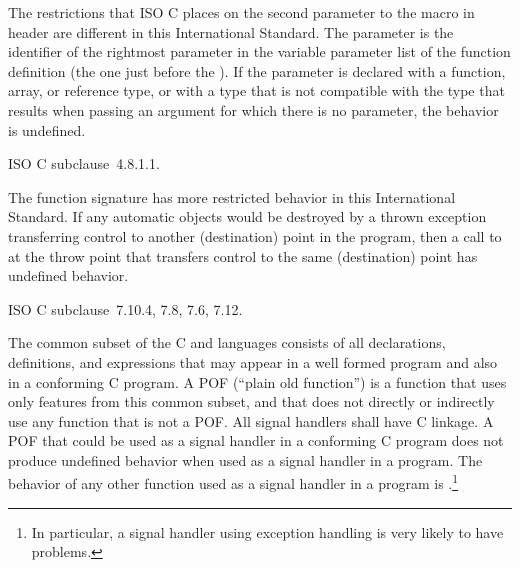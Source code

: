 \pnum
The restrictions that ISO C places on the second parameter to the
%
macro in header
%
are different in this International Standard.
The parameter
is the identifier of the rightmost parameter in the variable parameter list
of the function definition (the one just before the
).
If the parameter
is declared with a function, array, or reference type, or with a type that
is not compatible with the type that results when passing an argument for
which there is no parameter, the behavior is undefined.

\xref ISO C subclause~4.8.1.1.

\pnum
The function signature
%
has more restricted behavior in this International Standard.
If any automatic objects would be destroyed by a thrown exception transferring
control to another (destination) point in the program, then a call to
 at the throw point that transfers control to the
same (destination) point has undefined behavior.

\xref ISO C subclause~7.10.4, 7.8, 7.6, 7.12.

\pnum
The common subset of the C and \Cpp languages consists of all declarations,
definitions, and expressions that may appear in a well formed \Cpp program
and also in a conforming C program.
A
%
%
POF (``plain old function'') is a function that uses only features from
this common subset, and that does not directly or indirectly use any
function that is not a POF. All signal handlers shall have C linkage.
A POF that could be used as a signal handler in a conforming C program
does not produce undefined behavior when used as a signal handler in a
\Cpp program.
The behavior of any other function used as a signal handler in a
\Cpp program is .\footnote{In
particular, a signal handler using exception handling is very likely to
have problems.}
